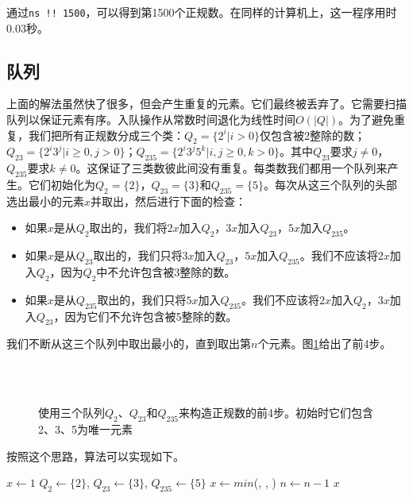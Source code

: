 \documentclass[b5paper]{ctexart}
\begin{document}
通过\texttt{ns !! 1500}，可以得到第1500个正规数。在同样的计算机上，这一程序用时0.03秒。

\subsection*{队列}
上面的解法虽然快了很多，但会产生重复的元素。它们最终被丢弃了。它需要扫描队列以保证元素有序。入队操作从常数时间退化为线性时间$O(|Q|)$。为了避免重复，我们把所有正规数分成三个类：$Q_2 = \{2^i | i > 0\}$仅包含被2整除的数；$Q_{23} = \{ 2^i3^j | i \geq 0, j > 0 \}$；$Q_{235} = \{ 2^i3^j5^k | i,j \geq 0, k > 0\}$。其中$Q_{23}$要求$j \neq 0$，$Q_{235}$要求$k \neq 0$。这保证了三类数彼此间没有重复。每类数我们都用一个队列来产生。它们初始化为$Q_2=\{ 2 \}$，$Q_{23} = \{ 3\}$和$Q_{235} = \{ 5 \}$。每次从这三个队列的头部选出最小的元素$x$并取出，然后进行下面的检查：

\begin{itemize}
\item 如果$x$是从$Q_2$取出的，我们将$2x$加入$Q_2$，$3x$加入$Q_{23}$，$5x$加入$Q_{235}$。
\item 如果$x$是从$Q_{23}$取出的，我们只将$3x$加入$Q_{23}$，$5x$加入$Q_{235}$。我们不应该将$2x$加入$Q_2$，因为$Q_2$中不允许包含被3整除的数。
\item 如果$x$是从$Q_{235}$取出的，我们只将$5x$加入$Q_{235}$。我们不应该将$2x$加入$Q_2$，$3x$加入$Q_{23}$，因为它们不允许包含被5整除的数。
\end{itemize}

我们不断从这三个队列中取出最小的，直到取出第$n$个元素。图\ref{fig:q235}给出了前4步。

\begin{figure}[htbp]
  \centering
   \\
   \\
  \caption{使用三个队列$Q_2$、$Q_{23}$和$Q_{235}$来构造正规数的前4步。初始时它们包含2、3、5为唯一元素}
  \label{fig:q235}
\end{figure}

按照这个思路，算法可以实现如下。

\begin{algorithmic}[1]
  \State $x \gets 1$
  \State $Q_2 \gets \{ 2 \}$, $Q_{23} \gets \{ 3 \}$, $Q_{235} \gets \{ 5 \}$
    \State $x \gets min$(, , )
      \State {}
      \State {}
      \State {}
      \State {}
      \State {}
      \State {}
      \State {}
    \Else
      \State {}
      \State {}
    \EndIf
    \State $n \gets n - 1$
  \EndWhile
  \State \Return $x$
\EndFunction
\end{algorithmic}
\end{document}

